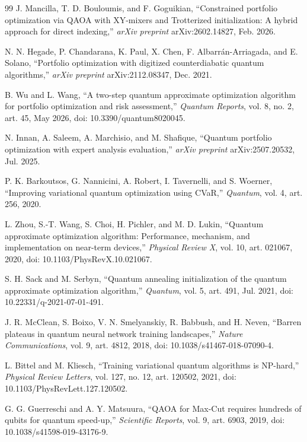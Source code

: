 \documentclass{ieeeaccess}
\begin{document}
\begin{thebibliography}{99}
 J. Mancilla, T. D. Bouloumis, and F. Goguikian, ``Constrained portfolio optimization via QAOA with XY-mixers and Trotterized initialization: A hybrid approach for direct indexing,'' \textit{arXiv preprint} arXiv:2602.14827, Feb. 2026.

 N. N. Hegade, P. Chandarana, K. Paul, X. Chen, F. Albarr\'{a}n-Arriagada, and E. Solano, ``Portfolio optimization with digitized counterdiabatic quantum algorithms,'' \textit{arXiv preprint} arXiv:2112.08347, Dec. 2021.

 B. Wu and L. Wang, ``A two-step quantum approximate optimization algorithm for portfolio optimization and risk assessment,'' \textit{Quantum Reports}, vol. 8, no. 2, art. 45, May 2026, doi: 10.3390/quantum8020045.

 N. Innan, A. Saleem, A. Marchisio, and M. Shafique, ``Quantum portfolio optimization with expert analysis evaluation,'' \textit{arXiv preprint} arXiv:2507.20532, Jul. 2025.

 P. K. Barkoutsos, G. Nannicini, A. Robert, I. Tavernelli, and S. Woerner, ``Improving variational quantum optimization using CVaR,'' \textit{Quantum}, vol. 4, art. 256, 2020.

 L. Zhou, S.-T. Wang, S. Choi, H. Pichler, and M. D. Lukin, ``Quantum approximate optimization algorithm: Performance, mechanism, and implementation on near-term devices,'' \textit{Physical Review X}, vol. 10, art. 021067, 2020, doi: 10.1103/PhysRevX.10.021067.

 S. H. Sack and M. Serbyn, ``Quantum annealing initialization of the quantum approximate optimization algorithm,'' \textit{Quantum}, vol. 5, art. 491, Jul. 2021, doi: 10.22331/q-2021-07-01-491.

 J. R. McClean, S. Boixo, V. N. Smelyanskiy, R. Babbush, and H. Neven, ``Barren plateaus in quantum neural network training landscapes,'' \textit{Nature Communications}, vol. 9, art. 4812, 2018, doi: 10.1038/s41467-018-07090-4.

 L. Bittel and M. Kliesch, ``Training variational quantum algorithms is NP-hard,'' \textit{Physical Review Letters}, vol. 127, no. 12, art. 120502, 2021, doi: 10.1103/PhysRevLett.127.120502.

 G. G. Guerreschi and A. Y. Matsuura, ``QAOA for Max-Cut requires hundreds of qubits for quantum speed-up,'' \textit{Scientific Reports}, vol. 9, art. 6903, 2019, doi: 10.1038/s41598-019-43176-9.


\end{thebibliography}
\end{document}
